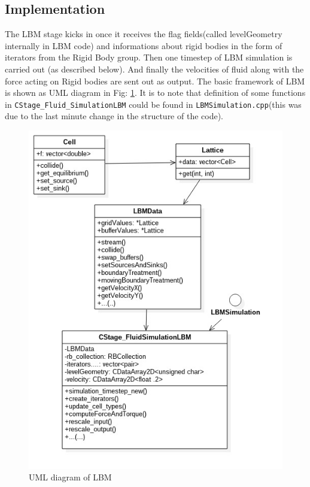 \subsection{Implementation}
The LBM stage kicks in once it receives the flag fields(called levelGeometry internally in LBM code)  and informations about rigid bodies in the form of iterators from the Rigid Body group. Then one timestep of LBM simulation is 
carried out (as described below). And finally the velocities of fluid along with
the force acting on Rigid bodies are sent out as output. The basic framework of
LBM is shown as UML diagram in Fig: \ref{fig: LBMUMLgraph}. It is to note that 
definition of some functions in \texttt{CStage_Fluid_SimulationLBM} could be found in \texttt{LBMSimulation.cpp}(this was due to the last minute change in the structure of the code).
\begin{figure}[ht]
	\centering
	\includegraphics[scale=0.5]{img/LBM/LBM_uml.jpg}
	\caption{UML diagram of LBM}
	\label{fig: LBMUMLgraph}
\end{figure} 

